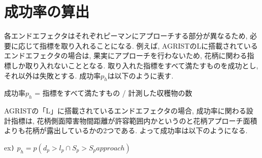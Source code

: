 \section{成功率の算出}
各エンドエフェクタはそれぞれピーマンにアプローチする部分が異なるため, 必要に応じて指標を取り入れることになる.
例えば, AGRISTのLに搭載されているエンドエフェクタの場合は, 果実にアプローチを行わないため, 花柄に関わる指標しか取り入れないこととなる.
取り入れた指標をすべて満たすものを成功とし, それ以外は失敗とする.
成功率$p_h$は以下のように表す.

\vspace{10mm}
成功率$p_h$ = 指標をすべて満たすもの / 計測した収穫物の数
\vspace{10mm}

AGRISTの「L」に搭載されているエンドエフェクタの場合, 成功率に関わる設計指標は, 花柄側面障害物間距離が許容範囲内かというのと花柄アプローチ面積よりも花柄が露出しているかの2つである.
よって成功率は以下のようになる.

\vspace{10mm}
ex\verb|)| $p_h = p(d_p > l_p \cap S_p > S_papproach)$
\vspace{10mm}
